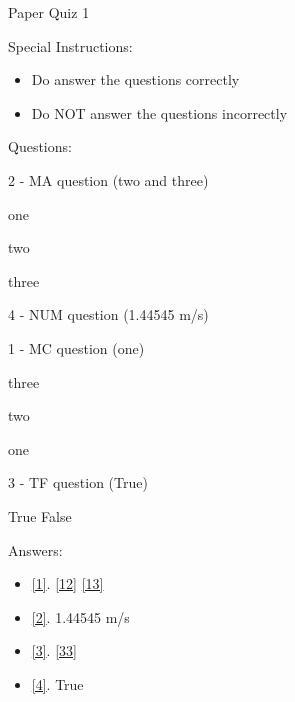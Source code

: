 \documentclass[letterpaper,10pt]{article}
\begin{document}
\begin{center}
{\Large Paper Quiz 1}
\end{center}

Special Instructions:
\begin{itemize}
    \item Do answer the questions correctly
    \item Do NOT answer the questions incorrectly
\end{itemize}
\vspace{10pt}
Questions:
\vspace{10pt}

\begin{compactenum} 
\begin{minipage}{\linewidth}
    \item \label{1} 2 - MA question (two and three)
    \begin{compactenum} 
        \item \label{11} one
        \item \label{12} two
        \item \label{13} three
    \end{compactenum}
    
    \end{minipage}

    \vspace{10pt}

\begin{minipage}{\linewidth}
    \item \label{2} 4 - NUM question (1.44545 m/s)
    
    \end{minipage}

    \vspace{10pt}

\begin{minipage}{\linewidth}
    \item \label{3} 1 - MC question (one)
    \begin{compactenum} 
        \item \label{31} three
        \item \label{32} two
        \item \label{33} one
    \end{compactenum}
    
    \end{minipage}

    \vspace{10pt}

\begin{minipage}{\linewidth}
    \item \label{4} 3 - TF question (True)

        True \hskip 1cm False
    
    \end{minipage}

    \vspace{10pt}

\end{compactenum}

\clearpage
Answers:
\begin{itemize}
      \item \ref{1}.
            \ref{12} 
            \ref{13} 
      \item \ref{2}.
            1.44545 m/s 
      \item \ref{3}.
            \ref{33} 
      \item \ref{4}.
            True 

\end{itemize}
\end{document}
